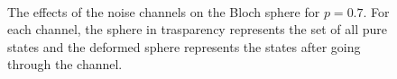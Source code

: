 \begin{figure}[h!]
\begin{minipage}[]{0.5\linewidth}
\end{minipage} \\
 \centering
 
\caption{\label{Channels}The effects of the noise channels on the Bloch sphere for $p=0.7$. For each channel, the sphere in trasparency represents the set of all pure states and the deformed sphere represents the states after going through the channel.}
\end{figure}




